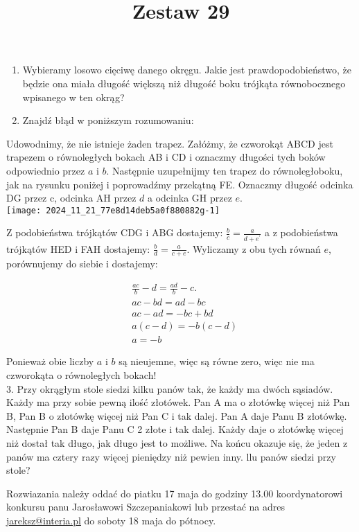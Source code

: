 \documentclass[10pt]{article}
\title{Zestaw 29 }
\author{}
\date{}
\begin{document}
\maketitle
\begin{enumerate}
  \item Wybieramy losowo cięciwę danego okręgu. Jakie jest prawdopodobieństwo, że będzie ona miała długość większą niż długość boku trójkąta równobocznego wpisanego w ten okrąg?
  \item Znajdź błąd w poniższym rozumowaniu:
\end{enumerate}

Udowodnimy, że nie istnieje żaden trapez. Załóżmy, że czworokąt ABCD jest trapezem o równoległych bokach AB i CD i oznaczmy długości tych boków odpowiednio przez \(a\) i \(b\). Następnie uzupełnijmy ten trapez do równoległoboku, jak na rysunku poniżej i poprowadźmy przekątną FE. Oznaczmy długość odcinka DG przez c, odcinka AH przez \(d\) a odcinka GH przez \(e\).\\
\texttt{[image: 2024\_11\_21\_77e8d14deb5a0f880882g-1]}

Z podobieństwa trójkątów CDG i ABG dostajemy: \(\frac{b}{c}=\frac{a}{d+e^{\prime}}\) a z podobieństwa trójkątów HED i FAH dostajemy: \(\frac{b}{d}=\frac{a}{c+e}\). Wyliczamy z obu tych równań \(e\), porównujemy do siebie i dostajemy:

\[
\begin{aligned}
& \frac{a c}{b}-d=\frac{a d}{b}-c . \\
& a c-b d=a d-b c \\
& a c-a d=-b c+b d \\
& a(c-d)=-b(c-d) \\
& a=-b
\end{aligned}
\]

Ponieważ obie liczby \(a\) i \(b\) są nieujemne, więc są równe zero, więc nie ma czworokąta o równoległych bokach!\\
3. Przy okrągłym stole siedzi kilku panów tak, że każdy ma dwóch sąsiadów. Każdy ma przy sobie pewną ilość złotówek. Pan A ma o złotówkę więcej niż Pan B, Pan B o złotówkę więcej niż Pan C i tak dalej. Pan A daje Panu B złotówkę. Następnie Pan B daje Panu C 2 złote i tak dalej. Każdy daje o złotówkę więcej niż dostał tak długo, jak długo jest to możliwe. Na końcu okazuje się, że jeden z panów ma cztery razy więcej pieniędzy niż pewien inny. llu panów siedzi przy stole?

Rozwiazania należy oddać do piatku 17 maja do godziny 13.00 koordynatorowi konkursu panu Jarosławowi Szczepaniakowi lub przestać na adres \href{mailto:jareksz@interia.pl}{jareksz@interia.pl} do soboty 18 maja do pótnocy.
\end{document}

